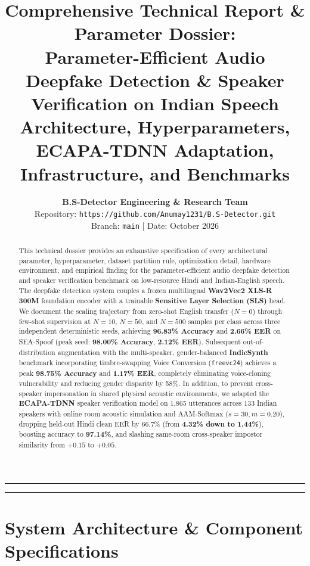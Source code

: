 \documentclass[11pt,a4paper]{article}
\title{\textbf{\Large Comprehensive Technical Report \& Parameter Dossier:}\\[0.3em]
\textbf{\large Parameter-Efficient Audio Deepfake Detection \& Speaker Verification on Indian Speech}\\
\large Architecture, Hyperparameters, ECAPA-TDNN Adaptation, Infrastructure, and Benchmarks}
\author{\textbf{B.S-Detector Engineering \& Research Team} \\
Repository: \texttt{https://github.com/Anumay1231/B.S-Detector.git} \\
Branch: \texttt{main} \quad | \quad Date: October 2026}
\date{}
\begin{document}
\maketitle

\begin{abstract}
This technical dossier provides an exhaustive specification of every architectural parameter, hyperparameter, dataset partition rule, optimization detail, hardware environment, and empirical finding for the parameter-efficient audio deepfake detection and speaker verification benchmark on low-resource Hindi and Indian-English speech. The deepfake detection system couples a frozen multilingual \textbf{Wav2Vec2 XLS-R 300M} foundation encoder with a trainable \textbf{Sensitive Layer Selection (SLS)} head. We document the scaling trajectory from zero-shot English transfer ($N=0$) through few-shot supervision at $N=10$, $N=50$, and $N=500$ samples per class across three independent deterministic seeds, achieving \textbf{96.83\% Accuracy} and \textbf{2.66\% EER} on SEA-Spoof (peak seed: \textbf{98.00\% Accuracy}, \textbf{2.12\% EER}). Subsequent out-of-distribution augmentation with the multi-speaker, gender-balanced \textbf{IndicSynth} benchmark incorporating timbre-swapping Voice Conversion (\texttt{freevc24}) achieves a peak \textbf{98.75\% Accuracy} and \textbf{1.17\% EER}, completely eliminating voice-cloning vulnerability and reducing gender disparity by 58\%. In addition, to prevent cross-speaker impersonation in shared physical acoustic environments, we adapted the \textbf{ECAPA-TDNN} speaker verification model on 1,865 utterances across 133 Indian speakers with online room acoustic simulation and AAM-Softmax ($s=30, m=0.20$), dropping held-out Hindi clean EER by 66.7\% (from \textbf{4.32\% down to 1.44\%}), boosting accuracy to \textbf{97.14\%}, and slashing same-room cross-speaker impostor similarity from $+0.15$ to $+0.05$.
\end{abstract}

\vspace{0.5em}
\hrule
\vspace{0.8em}

\tableofcontents

\vspace{0.8em}
\hrule
\vspace{1.2em}

\section{System Architecture \& Component Specifications}
\end{document}
